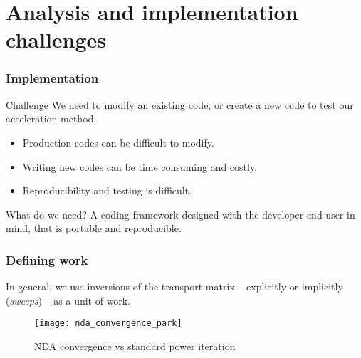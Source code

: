 \documentclass[xcolor=x11names, compress, handout]{beamer}
\begin{document}
\section{Analysis and implementation challenges}

\begin{frame}
  \frametitle{Implementation}
  \pause
  \begin{block}{Challenge}
    We need to modify an existing code, or create a new code to test
    our acceleration method.
  \end{block}
  \pause\vspace{1em}
  \begin{itemize}[<+->]
  \item Production codes can be difficult to modify. %
  \item Writing new codes can be time consuming and costly. %
  \item Reproducibility and testing is difficult.
  \end{itemize}\vspace{1em}
  \pause
  \begin{block}{What do we need?}
    A coding framework designed with the developer end-user in mind, that is portable and reproducible.
  \end{block}
\end{frame}

\begin{frame}
  \frametitle{Defining work}
  \pause
  In general, we use inversions of the transport matrix
  -- explicitly or implicitly (\textit{sweeps}) --  as a unit of work.
  \begin{figure}[H]
    \centering
    \texttt{[image: nda\_convergence\_park]}
    \caption{NDA convergence vs standard power iteration~\cite{Park2012}\label{fig:nda_convergence}}
  \end{figure}
\end{frame}
\end{document}
